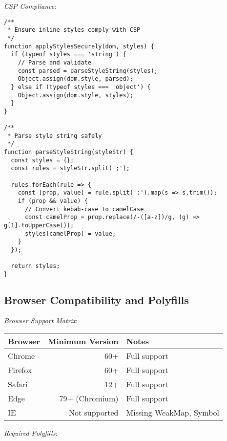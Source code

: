 \documentclass[11pt]{article}
\begin{document}
\emph{CSP Compliance}:

\begin{verbatim}
/**
 * Ensure inline styles comply with CSP
 */
function applyStylesSecurely(dom, styles) {
  if (typeof styles === 'string') {
    // Parse and validate
    const parsed = parseStyleString(styles);
    Object.assign(dom.style, parsed);
  } else if (typeof styles === 'object') {
    Object.assign(dom.style, styles);
  }
}

/**
 * Parse style string safely
 */
function parseStyleString(styleStr) {
  const styles = {};
  const rules = styleStr.split(';');
  
  rules.forEach(rule => {
    const [prop, value] = rule.split(':').map(s => s.trim());
    if (prop && value) {
      // Convert kebab-case to camelCase
      const camelProp = prop.replace(/-([a-z])/g, (g) => g[1].toUpperCase());
      styles[camelProp] = value;
    }
  });
  
  return styles;
}
\end{verbatim}
\subsection{Browser Compatibility and Polyfills}
\label{sec:orgae62574}

\emph{Browser Support Matrix}:

\begin{center}
\begin{tabular}{lrl}
Browser & Minimum Version & Notes\\
\hline
Chrome & 60+ & Full support\\
Firefox & 60+ & Full support\\
Safari & 12+ & Full support\\
Edge & 79+ (Chromium) & Full support\\
IE & Not supported & Missing WeakMap, Symbol\\
\end{tabular}
\end{center}

\emph{Required Polyfills}:
\end{document}
